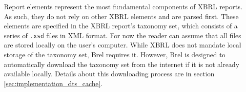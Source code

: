 



Report elements represent the most fundamental components of XBRL reports.
As such, they do not rely on other XBRL elements and are parsed first.
These elements are specified in the XBRL report's taxonomy set, which consists of a series of \texttt{.xsd} files in XML format.
For now the reader can assume that all files are stored locally on the user's computer.
While XBRL does not mandate local storage of the taxonomy set, Brel requires it.
However, Brel is designed to automatically download the taxonomy set from the internet if it is not already available locally.
Details about this downloading process are in section \ref{sec:implementation_dts_cache}.

